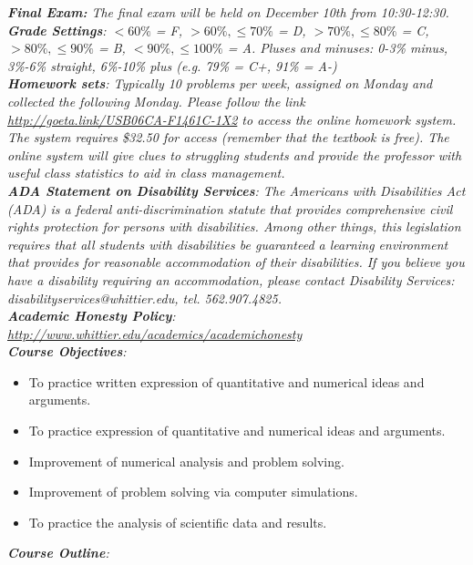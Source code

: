 \documentclass[10pt]{article}
\begin{document}
\textit{\textbf{Final Exam:} The final exam will be held on December 10th from 10:30-12:30.} \\
\textit{\textbf{Grade Settings}: $<60\%$ = F, $>60\%,\leq 70\%$ = D, $>70\%,\leq80\%$ = C, $>80\%,\leq 90\%$ = B, $<90\%,\leq 100\%$ = A.  Pluses and minuses: 0-3\% minus, 3\%-6\% straight, 6\%-10\% plus (e.g. 79\% = C+, 91\% = A-)} \\
\textit{\textbf{Homework sets}: Typically 10 problems per week, assigned on Monday and collected the following Monday.  Please follow the link \url{http://goeta.link/USB06CA-F1461C-1X2} to access the online homework system.  The system requires \$32.50 for access (remember that the textbook is free).  The online system will give clues to struggling students and provide the professor with useful class statistics to aid in class management.} \\
\textit{\textbf{ADA Statement on Disability Services}: The Americans with Disabilities Act (ADA) is a federal anti-discrimination statute that provides comprehensive civil rights protection for persons with disabilities. Among other things, this legislation requires that all students with disabilities be guaranteed a learning environment that provides for reasonable accommodation of their disabilities. If you believe you have a disability requiring an accommodation, please contact Disability Services: disabilityservices@whittier.edu, tel. 562.907.4825.} \\
\textit{\textbf{Academic Honesty Policy}: \url{http://www.whittier.edu/academics/academichonesty}} \\
\textit{\textbf{Course Objectives}:}
\begin{itemize}
\item To practice written expression of quantitative and numerical ideas and arguments.
\item To practice expression of quantitative and numerical ideas and arguments.
\item Improvement of numerical analysis and problem solving.
\item Improvement of problem solving via computer simulations.
\item To practice the analysis of scientific data and results.
\end{itemize}
\textit{\textbf{Course Outline}:}
\end{document}
